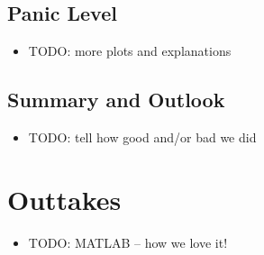 \documentclass{beamer}
\begin{document}
\subsection{Panic Level}
\begin{frame}
	\begin{itemize}
		\item TODO: more plots and explanations
	\end{itemize}
\end{frame}

\subsection{Summary and Outlook}
\begin{frame}
	\begin{itemize}
		\item TODO: tell how good and/or bad we did
	\end{itemize}
\end{frame}

\section{Outtakes}

\begin{frame}
	\begin{itemize}
		\item TODO: MATLAB -- how we love it!
	\end{itemize}
\end{frame}
\end{document}
